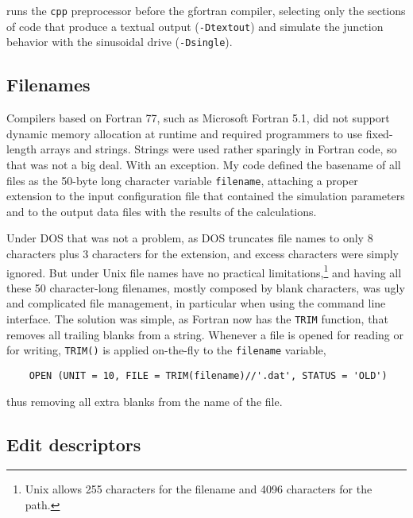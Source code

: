 runs the \texttt{cpp} preprocessor before the gfortran compiler, selecting only the sections of code that produce a textual output (\texttt{-Dtextout}) and simulate the junction behavior with the sinusoidal drive (\texttt{-Dsingle}).



\subsection{Filenames}

Compilers based on Fortran 77, such as Microsoft Fortran 5.1, did not support dynamic memory allocation at runtime and required programmers to use fixed-length arrays and strings. Strings were used rather sparingly in Fortran code, so that was not a big deal. With an exception. 
My code defined the basename of all files as the 50-byte long character variable \texttt{filename}, attaching a proper extension to the input configuration file that contained the simulation parameters and to the output data files with the results of the calculations.

Under DOS that was not a problem, as DOS truncates file names to only 8 characters plus 3 characters for the extension, and excess characters were simply ignored. But under Unix file names have no practical limitations,\footnote{Unix allows 255 characters for the filename and 4096 characters for the path.} and having all these 50 character-long filenames, mostly composed by blank characters, was ugly and complicated file management, in particular when using the command line interface.
The solution was simple, as Fortran now has the \texttt{TRIM} function, that removes all trailing blanks from a string. 
Whenever a file is opened for reading or for writing, \texttt{TRIM()} is applied on-the-fly to the \texttt{filename} variable,

\begin{lstlisting}
	OPEN (UNIT = 10, FILE = TRIM(filename)//'.dat', STATUS = 'OLD')
\end{lstlisting}

thus removing all extra blanks from the name of the file.



\subsection{Edit descriptors}

